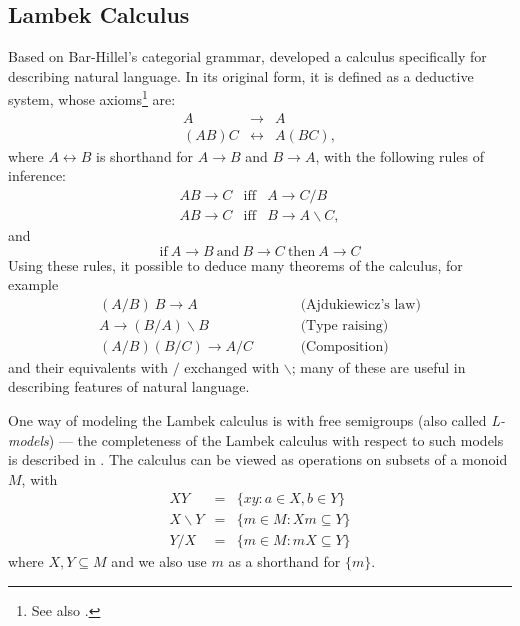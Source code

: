 \documentclass[12pt]{report}
\begin{document}
\subsection{Lambek Calculus}


Based on Bar-Hillel's categorial grammar, \cite{Lambek:58} developed a calculus specifically for describing natural language. In its original form, it is defined as a deductive system, whose axioms\footnote{See also \cite{Wood:93}.} are:
\begin{eqnarray*}
A & \rightarrow & A\\
(AB)C & \leftrightarrow  & A(BC),
\end{eqnarray*}
where $A \leftrightarrow B$ is shorthand for $A\rightarrow B$ and $B\rightarrow A$, with the following rules of inference:
\begin{eqnarray*}
AB \rightarrow C & \mathrm{iff} & A\rightarrow C/B\\
AB \rightarrow C & \mathrm{iff} & B\rightarrow A\backslash C,
\end{eqnarray*}
and
$$\mathrm{if}\ A\rightarrow B\ \mathrm{and}\  B\rightarrow C\ \mathrm{then}\ A\rightarrow C$$
Using these rules, it possible to deduce many theorems of the calculus, for example
$$\begin{aligned}
(A/B)\ B \rightarrow A& &\quad &\text{(Ajdukiewicz's law)}\\
A \rightarrow (B/A)\backslash B & & &\text{(Type raising)}\\
(A/B)(B/C) \rightarrow A/C & & &\text{(Composition)}
\end{aligned}$$
and their equivalents with $/$ exchanged with $\backslash$; many of these are useful in describing features of natural language.

One way of modeling the Lambek calculus is with free semigroups (also called \emph{L-models}) --- the completeness of the Lambek calculus with respect to such models is described in \cite{Pentus:95}. The calculus can be viewed as operations on subsets  of a monoid $M$, with
\begin{eqnarray*}
XY &=& \{xy : a \in X, b \in Y\} \\
X \backslash Y &=& \{m \in M : Xm \subseteq Y\} \\
Y / X &=& \{m \in M : mX \subseteq Y\}
\end{eqnarray*}
where $X,Y\subseteq M$ and we also use $m$ as a shorthand for $\{m\}$.
\end{document}
